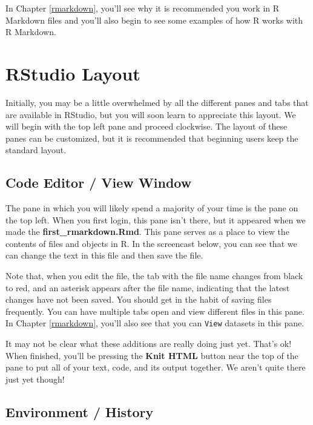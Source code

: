 \documentclass[]{tufte-book}
\begin{document}
In Chapter \ref{rmarkdown}, you'll see why it is recommended you work in R Markdown files and you'll also begin to see some examples of how R works with R Markdown.

\hypertarget{rstudio-layout}{%
\section{RStudio Layout}\label{rstudio-layout}}

Initially, you may be a little overwhelmed by all the different panes and tabs that are available in RStudio, but you will soon learn to appreciate this layout. We will begin with the top left pane and proceed clockwise. The layout of these panes can be customized, but it is recommended that beginning users keep the standard layout.

\hypertarget{code-editor-view-window}{%
\subsection{Code Editor / View Window}\label{code-editor-view-window}}

The pane in which you will likely spend a majority of your time is the pane on the top left. When you first login, this pane isn't there, but it appeared when we made the \textbf{first\_rmarkdown.Rmd}. This pane serves as a place to view the contents of files and objects in R. In the screencast below, you can see that we can change the text in this file and then save the file.

Note that, when you edit the file, the tab with the file name changes from black to red, and an asterisk appears after the file name, indicating that the latest changes have not been saved. You should get in the habit of saving files frequently. You can have multiple tabs open and view different files in this pane. In Chapter \ref{rmarkdown}, you'll also see that you can \texttt{View} datasets in this pane.

It may not be clear what these additions are really doing just yet. That's ok! When finished, you'll be pressing the \textbf{Knit HTML} button near the top of the pane to put all of your text, code, and its output together. We aren't quite there just yet though!

\hypertarget{environment-history}{%
\subsection{Environment / History}\label{environment-history}}
\end{document}

